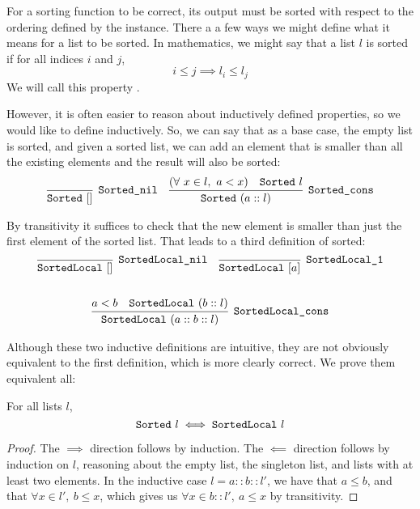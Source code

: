 \documentclass[11pt]{thesis}
\begin{document}
For a sorting function to be correct, its output must be sorted with
respect to the ordering defined by the  instance. There a
a few ways we might define what it means for a list to be sorted. In
mathematics, we might say that a list $l$ is sorted if for all indices
$i$ and $j$,
\begin{equation*}
  i \le j \implies l_i \le l_j
\end{equation*}
We will call this property .

However, it is often easier to reason about inductively defined
properties, so we would like to define  inductively. So,
we can say that as a base case, the empty list is sorted, and given a
sorted list, we can add an element that is smaller than all the
existing elements and the result will also be sorted:
\begin{align*}
  \infer[\var{Sorted\_nil}]{\var{Sorted}~[]}{}
  &&
  \infer[\var{Sorted\_cons}]{\var{Sorted}~(a :: l)}{%
    (\forall~x \in l,~a < x) & \var{Sorted}~l
  }
\end{align*}

By transitivity it suffices to check that the new element is
smaller than just the first element of the sorted list. That leads to
a third definition of sorted:
\begin{gather*}
  \begin{align*}
    \infer[\var{SortedLocal\_nil}]{\var{SortedLocal}~[]}{}
    &&
    \infer[\var{SortedLocal\_1}]{\var{SortedLocal}~[a]}{}
  \end{align*}
  \\
  \\
  \infer[\var{SortedLocal\_cons}]{\var{SortedLocal}~(a :: b :: l)}{%
    a < b & \var{SortedLocal}~(b :: l)
  }
\end{gather*}

Although these two inductive definitions are intuitive, they are not
obviously equivalent to the first definition, which is more clearly
correct. We prove them equivalent all:
\begin{theorem}
  For all lists $l$,
  \begin{equation*}
    \texttt{Sorted}~l \iff \texttt{SortedLocal}~l
  \end{equation*}
\end{theorem}
\begin{proof}
  The $\implies$ direction follows by induction. The $\impliedby$
  direction follows by induction on $l$, reasoning about the empty
  list, the singleton list, and lists with at least two elements. In
  the inductive case $l = a :: b :: l'$, we have that $a \le b$, and
  that $\forall x \in l',~b \le x$, which gives us $\forall x \in b :: l',~a \le x$ by
  transitivity.
\end{proof}
\end{document}
